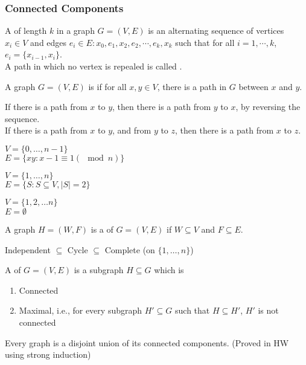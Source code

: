 \documentclass[11pt]{scrartcl}
\begin{document}
\subsubsection{Connected Components}
\begin{definition}
    A  of length $k$ in a graph $G = (V, E)$ is an alternating sequence of vertices $x_i \in V$ and edges $e_i \in E: x_0, e_1, x_2, e_2, \cdots, e_k, x_k$ such that for all $i = 1, \cdots, k$, $e_i = \{x_{i-1}, x_i\}$.\\
    A path in which no vertex is repealed is called .
\end{definition}
\begin{definition}
    A graph $G = (V, E)$ is  if for all $x, y \in V$, there is a path in $G$ between $x$ and $y$.
\end{definition}
\begin{remark}
    If there is a path from $x$ to $y$, then there is a path from $y$ to $x$, by reversing the sequence.\\
    If there is a path from $x$ to $y$, and from $y$ to $z$, then there is a path from $x $ to $z$. 
\end{remark}
\begin{example}[Cycle]
    $V = \{0, \dots, n-1\}$\\
    $E = \{xy : x-1 \equiv 1 (\mod n)\}$
\end{example}
\begin{example}[Complete]
    $V = \{1, \dots, n\}$\\
    $E = \{S: S \subseteq V, |S| = 2\}$
\end{example}
\begin{example}
    $V = \{1, 2, \dots n\}$\\
    $E = \emptyset$
\end{example}
\begin{definition}[Subgraph]
    A graph $H = (W, F)$ is a  of $G = (V, E)$ if $W \subseteq V$ and $F \subseteq E$.
\end{definition}
\begin{example}
    Independent $\subseteq$ Cycle $\subseteq$ Complete (on $\{1, \dots, n\}$)
\end{example}
\begin{definition}
    A  of $G = (V, E)$ is a subgraph $H \subseteq G$ which is \begin{enumerate}
        \item Connected
        \item Maximal, i.e., for every subgraph $H' \subseteq G$ such that $H \subseteq H'$, $H'$ is not connected
    \end{enumerate}
\end{definition}
\begin{theorem}
    Every graph is a disjoint union of its connected components.  (Proved in HW using strong induction)
\end{theorem}
\end{document}

